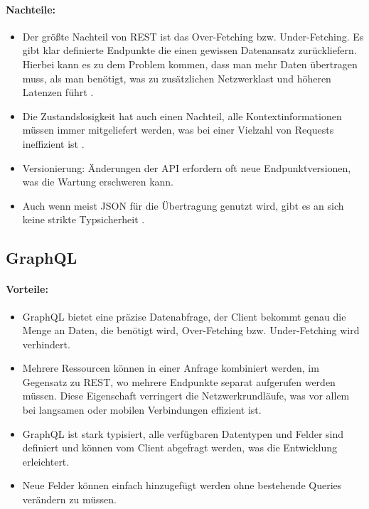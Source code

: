 \paragraph{Nachteile:}
\begin{itemize}
	\item Der größte Nachteil von REST ist das Over-Fetching bzw. Under-Fetching. Es gibt klar definierte Endpunkte die einen gewissen Datenansatz zurückliefern. Hierbei kann es zu dem Problem kommen, dass man mehr Daten übertragen muss, als man benötigt, was zu zusätzlichen Netzwerklast und höheren Latenzen führt \parencite{amazon2025graphql}.
	\item Die Zustandslosigkeit hat auch einen Nachteil, alle Kontextinformationen müssen immer mitgeliefert werden, was bei einer Vielzahl von Requests ineffizient ist \parencite{fielding2000rest}.
	\item Versionierung: Änderungen der API erfordern oft neue Endpunktversionen, was die Wartung erschweren kann.
	\item Auch wenn meist JSON für die Übertragung genutzt wird, gibt es an sich keine strikte Typsicherheit \parencite{redhat-apiguide}. 
\end{itemize}

\subsection{GraphQL}

\paragraph{Vorteile:}
\begin{itemize}
	\item GraphQL bietet eine präzise Datenabfrage, der Client bekommt genau die Menge an Daten, die benötigt wird, Over-Fetching bzw. Under-Fetching wird verhindert.
	\item Mehrere Ressourcen können in einer Anfrage kombiniert werden, im Gegensatz zu REST, wo mehrere Endpunkte separat aufgerufen werden müssen. Diese Eigenschaft verringert die Netzwerkrundläufe, was vor allem bei langsamen oder mobilen Verbindungen effizient ist.
	\item GraphQL ist stark typisiert, alle verfügbaren Datentypen und Felder sind definiert und können vom Client abgefragt werden, was die Entwicklung erleichtert. 
	\item Neue Felder können einfach hinzugefügt werden ohne bestehende Queries verändern zu müssen.
\end{itemize}

